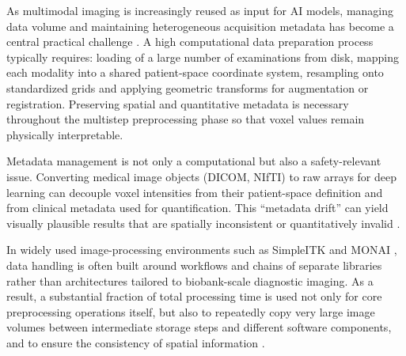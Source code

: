 \documentclass[a4paper,10pt,preprint]{elsarticle}
\begin{document}

As multimodal imaging is increasingly reused as input for AI models, managing data volume and maintaining heterogeneous acquisition metadata has become a central practical challenge \cite{Simon_2024}. A high computational data preparation process typically requires: loading of a large number of examinations from disk, mapping each modality into a shared patient-space coordinate system, resampling onto standardized grids and applying geometric transforms for augmentation or registration. Preserving spatial and quantitative metadata is necessary throughout the multistep preprocessing phase so that voxel values remain physically interpretable. 


Metadata management is not only a computational but also a safety-relevant issue. Converting medical image objects (DICOM, NIfTI) to raw arrays for deep learning can decouple voxel intensities from their patient-space definition and from clinical metadata used for quantification. This ``metadata drift'' can yield visually plausible results that are spatially inconsistent or quantitatively invalid \cite{Elias_2023}.

In widely used image-processing environments such as SimpleITK \cite{LowekampChen2013} and MONAI \cite{CardosoLi2022}, data handling is often built around workflows and chains of separate libraries rather than architectures tailored to biobank-scale diagnostic imaging. As a result, a substantial fraction of total processing time is used not only for core preprocessing operations itself, but also to repeatedly copy very large image volumes between intermediate storage steps and different software components, and to ensure the consistency of spatial information \cite{Dexl_2025}.
\end{document}
